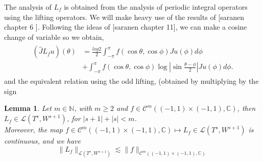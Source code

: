 \documentclass{article}
\newtheorem{lemma}[theorem]{Lemma}
\newcommand{\todo}[1]{{\color{red}[#1]}}
\newcommand{\IC}{{\mathbb C}}
\newcommand{\IN}{{\mathbb N}}
\newcommand{\cmspace}[3]{\mathcal{C}^{#1} \left( #2, #3 \right)}
\newcommand{\iinterv}{(-1,1)\times(-1,1)}
\begin{document}
The analysis of $L_f$ is obtained from the analysis of periodic integral operators using the lifting operators. We will make heavy use of the results of \todo{saranen chapter 6  }. Following the ideas of \todo{saranen chapter 11}, we can make a cosine change of variable so we obtain,
\begin{align}
\label{eq:Lsplit}
\begin{split}
(\widehat{J}L_fu)(\theta) &= \frac{log{2}}{2} \int_{-\pi}^{\pi} f(\cos \theta , \cos \phi) Ju(\phi) d\phi \\&+ \int_{-\pi}^{\pi} f(\cos \theta, \cos \phi) \log \left\vert \sin \frac{\theta-\phi}{2} \right\vert Ju(\phi) d\phi.
\end{split}
\end{align}
and the equivalent relation using the odd lifting, (obtained by multiplying by the sign
\begin{lemma}
\label{lemma:Lfoperator}
Let $m \in \IN$, with $m\geq 2$ and $f \in \cmspace{m}{\iinterv}{\IC}$, then $L_f \in \mathcal{L}(T^s,W^{s+1})$, for $|s+1| +|s| <m$. \\Moreover, the map $f \in \cmspace{m}{\iinterv}{\IC} \mapsto L_f \in \mathcal{L}(T^s,W^{s+1})$ is continuous, and we have 
$$
\|L_f\|_{\mathcal{L}(T^s,W^{s+1})} \lesssim \|f\|_{\cmspace{m}{\iinterv}{\IC}}
$$
\end{lemma}
\end{document}
